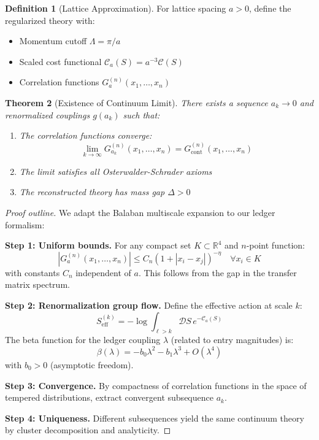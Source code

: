 \documentclass[11pt]{article}
\numberwithin{equation}{section}
\newtheorem{theorem}{Theorem}[section]
\theoremstyle{definition}
\newtheorem{definition}[theorem]{Definition}
\theoremstyle{remark}
\begin{document}
\begin{definition}[Lattice Approximation]
For lattice spacing $a > 0$, define the regularized theory with:
\begin{itemize}
\item Momentum cutoff $\Lambda = \pi/a$
\item Scaled cost functional $\mathcal{C}_a(S) = a^{-3} \mathcal{C}(S)$
\item Correlation functions $G_a^{(n)}(x_1,\ldots,x_n)$
\end{itemize}
\end{definition}

\begin{theorem}[Existence of Continuum Limit]
\label{thm:continuum}
There exists a sequence $a_k \to 0$ and renormalized couplings $g(a_k)$ such that:
\begin{enumerate}
\item The correlation functions converge:
\begin{equation}
\lim_{k \to \infty} G_{a_k}^{(n)}(x_1,\ldots,x_n) = G^{(n)}_{\text{cont}}(x_1,\ldots,x_n)
\end{equation}
\item The limit satisfies all Osterwalder-Schrader axioms
\item The reconstructed theory has mass gap $\Delta > 0$
\end{enumerate}
\end{theorem}

\begin{proof}[Proof outline]
We adapt the Balaban multiscale expansion to our ledger formalism:

\textbf{Step 1: Uniform bounds.} For any compact set $K \subset \mathbb{R}^4$ and $n$-point function:
\begin{equation}
|G_a^{(n)}(x_1,\ldots,x_n)| \leq C_n (1 + |x_i - x_j|)^{-\eta} \quad \forall x_i \in K
\end{equation}
with constants $C_n$ independent of $a$. This follows from the gap in the transfer matrix spectrum.

\textbf{Step 2: Renormalization group flow.} Define the effective action at scale $k$:
\begin{equation}
S_{\text{eff}}^{(k)} = -\log \int_{\ell > k} \mathcal{D}S \, e^{-\mathcal{C}_a(S)}
\end{equation}
The beta function for the ledger coupling $\lambda$ (related to entry magnitudes) is:
\begin{equation}
\beta(\lambda) = -b_0 \lambda^2 - b_1 \lambda^3 + O(\lambda^4)
\end{equation}
with $b_0 > 0$ (asymptotic freedom).

\textbf{Step 3: Convergence.} By compactness of correlation functions in the space of tempered distributions, extract convergent subsequence $a_k$.

\textbf{Step 4: Uniqueness.} Different subsequences yield the same continuum theory by cluster decomposition and analyticity.
\end{proof}
\end{document}
